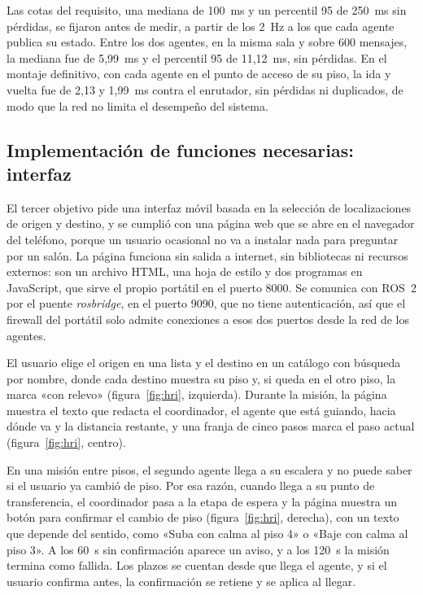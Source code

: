 Las cotas del requisito, una mediana de 100~ms y un percentil 95 de 250~ms sin pérdidas, se fijaron antes de medir, a partir de los 2~Hz a los que cada agente publica su estado. Entre los dos agentes, en la misma sala y sobre 600 mensajes, la mediana fue de 5,99~ms y el percentil 95 de 11,12~ms, sin pérdidas. En el montaje definitivo, con cada agente en el punto de acceso de su piso, la ida y vuelta fue de 2,13 y 1,99~ms contra el enrutador, sin pérdidas ni duplicados, de modo que la red no limita el desempeño del sistema.

\subsection{Implementación de funciones necesarias: interfaz}
\label{sec:oe3}
\label{sec:ajustes-campo}

El tercer objetivo pide una interfaz móvil basada en la selección de localizaciones de origen y destino, y se cumplió con una página web que se abre en el navegador del teléfono, porque un usuario ocasional no va a instalar nada para preguntar por un salón. La página funciona sin salida a internet, sin bibliotecas ni recursos externos: son un archivo HTML, una hoja de estilo y dos programas en JavaScript, que sirve el propio portátil en el puerto 8000. Se comunica con ROS~2 por el puente \textit{rosbridge}, en el puerto 9090, que no tiene autenticación, así que el firewall del portátil solo admite conexiones a esos dos puertos desde la red de los agentes.

El usuario elige el origen en una lista y el destino en un catálogo con búsqueda por nombre, donde cada destino muestra su piso y, si queda en el otro piso, la marca «con relevo» (figura~\ref{fig:hri}, izquierda). Durante la misión, la página muestra el texto que redacta el coordinador, el agente que está guiando, hacia dónde va y la distancia restante, y una franja de cinco pasos marca el paso actual (figura~\ref{fig:hri}, centro).

En una misión entre pisos, el segundo agente llega a su escalera y no puede saber si el usuario ya cambió de piso. Por esa razón, cuando llega a su punto de transferencia, el coordinador pasa a la etapa de espera y la página muestra un botón para confirmar el cambio de piso (figura~\ref{fig:hri}, derecha), con un texto que depende del sentido, como «Suba con calma al piso 4» o «Baje con calma al piso 3». A los 60~s sin confirmación aparece un aviso, y a los 120~s la misión termina como fallida. Los plazos se cuentan desde que llega el agente, y si el usuario confirma antes, la confirmación se retiene y se aplica al llegar.

